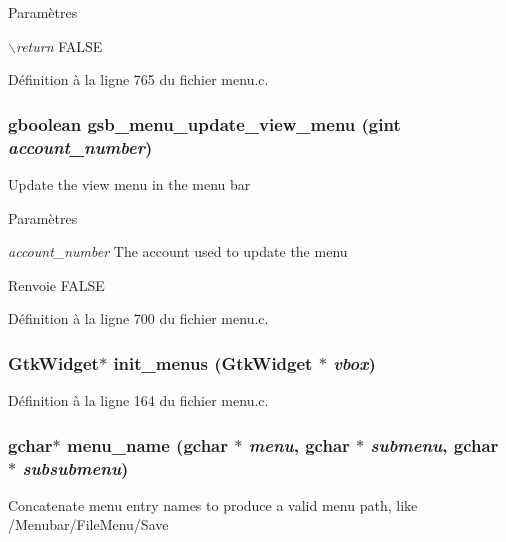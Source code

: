 \begin{DoxyParams}{Paramètres}
\item[{\em $\backslash$return}]FALSE \end{DoxyParams}


Définition à la ligne 765 du fichier menu.c.

\subsubsection[{gsb\_\-menu\_\-update\_\-view\_\-menu}]{\setlength{\rightskip}{0pt plus 5cm}gboolean gsb\_\-menu\_\-update\_\-view\_\-menu (gint {\em account\_\-number})}\label{menu_8c_a60f727414d6ce8974582d80ae95c1f81}
Update the view menu in the menu bar


\begin{DoxyParams}{Paramètres}
\item[{\em account\_\-number}]The account used to update the menu\end{DoxyParams}
\begin{DoxyReturn}{Renvoie}
FALSE 
\end{DoxyReturn}


Définition à la ligne 700 du fichier menu.c.

\subsubsection[{init\_\-menus}]{\setlength{\rightskip}{0pt plus 5cm}GtkWidget$\ast$ init\_\-menus (GtkWidget $\ast$ {\em vbox})}\label{menu_8c_a797e59b4900aa4af71181ca9b7145aa4}


Définition à la ligne 164 du fichier menu.c.

\subsubsection[{menu\_\-name}]{\setlength{\rightskip}{0pt plus 5cm}gchar$\ast$ menu\_\-name (gchar $\ast$ {\em menu}, \/  gchar $\ast$ {\em submenu}, \/  gchar $\ast$ {\em subsubmenu})}\label{menu_8c_a8bf02c2e8820e600ffa71a0ef9f6cce8}
Concatenate menu entry names to produce a valid menu path, like /Menubar/FileMenu/Save


